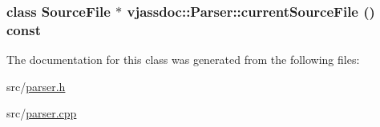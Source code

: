 \hypertarget{classvjassdoc_1_1Parser_aa986d6eebbef504e87222ff05dc5d33}{
\subsubsection{\setlength{\rightskip}{0pt plus 5cm}class {\bf SourceFile} $\ast$ vjassdoc::Parser::currentSourceFile () const}}
\label{classvjassdoc_1_1Parser_aa986d6eebbef504e87222ff05dc5d33}




The documentation for this class was generated from the following files:\begin{CompactItemize}
\item 
src/\hyperlink{parser_8h}{parser.h}\item 
src/\hyperlink{parser_8cpp}{parser.cpp}\end{CompactItemize}
